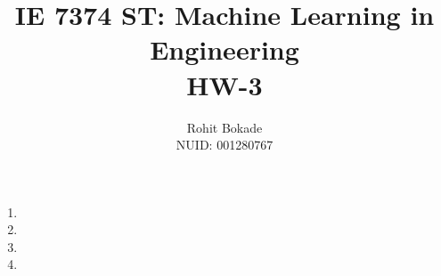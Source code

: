 \documentclass[11pt]{article}
\title{IE 7374 ST: Machine Learning in Engineering \\ HW-3}
\author{Rohit Bokade \\ NUID: 001280767}
\begin{document}
	
	\maketitle 
	\begin{enumerate}
		\item 
		\item 
		\item 
		\item 	
	\end{enumerate}
\end{document}
